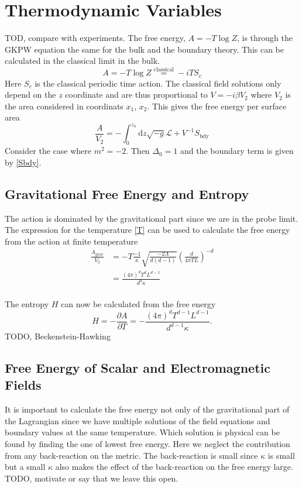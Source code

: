 \documentclass[12pt]{report}
\renewcommand{\d}{\ensuremath{\mathrm{d}}}
\renewcommand{\L}{\ensuremath{\mathcal{L}}}
\renewcommand{\i}{\ensuremath{i}}
\begin{document}
\section{Thermodynamic Variables}
TOD, compare with experiments.
The free energy, $A=-T\log{Z}$, is through the GKPW equation the same for the bulk and the boundary theory. This can be calculated in the classical limit in the bulk.
\begin{equation}
 A=-T\log{Z}\stackrel{\mathrm{classical}}{=}-\i T S_c
\end{equation}
Here $S_c$ is the classical periodic time action. The classical field solutions only depend on the $z$ coordinate and are thus proportional to $V=-\i\beta V_2$ where $V_2$ is the area considered in coordinats $x_1$, $x_2$. This gives the free energy per surface area
\begin{equation}
 \frac{A}{V_2}=-\int_0^{z_h}\d z \sqrt{-g}\L+V^{-1}S_{\mathrm{bdy}}
\end{equation}
Consider the case where $m^2=-2$. Then $\Delta_0=1$ and the boundary term is given by \eqref{Sbdy}.\\
\subsection{Gravitational Free Energy and Entropy}
The action is dominated by the gravitational part since we are in the probe limit. 
The expression for the temperature \eqref{T} can be used to calculate the free energy from the action at finite temperature
\begin{equation}
\begin{split}
 \frac{A_\mathrm{grav}}{V_2}&=-T\frac{-1}{\kappa}\sqrt{\frac{-2\Lambda}{d(d-1)}}\left(\frac{d}{4\pi TL}\right)^{-d}\\
&=\frac{(4\pi)^dT^dL^{d-1}}{d^{d}\kappa}
\end{split}
\end{equation}
\\
The entropy $H$ can now be calculated from the free energy
\begin{equation}
 H=-\frac{\partial A}{\partial T}=-\frac{(4\pi)^dT^{d-1}L^{d-1}}{d^{d-1}\kappa}.
\end{equation}
TODO, Beckenstein-Hawking
\subsection{Free Energy of Scalar and Electromagnetic Fields}
It is important to calculate the free energy not only of the gravitational part of the Lagrangian since we have multiple solutions of the field equations and boundary values at the same temperature. Which solution is physical can be found by finding the one of lowest free energy. Here we neglect the contribution from any back-reaction on the metric. The back-reaction is small since $\kappa$ is small but a small $\kappa$ also makes the effect of the back-reaction on the free energy large. TODO, motivate or say that we leave this open.\\
\end{document}
